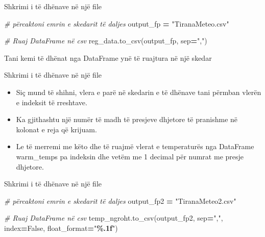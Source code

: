 \documentclass[
  ignorenonframetext,
]{beamer}
\newenvironment{Shaded}{\begin{snugshade}}{\end{snugshade}}
\newcommand{\CommentTok}[1]{\textcolor[rgb]{0.56,0.35,0.01}{\textit{#1}}}
\newcommand{\NormalTok}[1]{#1}
\newcommand{\OperatorTok}[1]{\textcolor[rgb]{0.81,0.36,0.00}{\textbf{#1}}}
\newcommand{\SpecialCharTok}[1]{\textcolor[rgb]{0.81,0.36,0.00}{\textbf{#1}}}
\newcommand{\StringTok}[1]{\textcolor[rgb]{0.31,0.60,0.02}{#1}}
\newcommand{\VariableTok}[1]{\textcolor[rgb]{0.00,0.00,0.00}{#1}}
\begin{document}
\begin{frame}[fragile]{Shkrimi i të dhënave në një file}
\protect\hypertarget{shkrimi-i-tuxeb-dhuxebnave-nuxeb-njuxeb-file-2}{}
\begin{Shaded}
\begin{Highlighting}[]
\CommentTok{\# përcaktoni emrin e skedarit të daljes}
\NormalTok{output\_fp }\OperatorTok{=} \StringTok{"TiranaMeteo.csv"}

\CommentTok{\# Ruaj DataFrame në csv}
\NormalTok{reg\_data.to\_csv(output\_fp, sep}\OperatorTok{=}\StringTok{","}\NormalTok{)}
\end{Highlighting}
\end{Shaded}

Tani kemi të dhënat nga DataFrame ynë të ruajtura në një skedar
\end{frame}

\begin{frame}{Shkrimi i të dhënave në një file}
\protect\hypertarget{shkrimi-i-tuxeb-dhuxebnave-nuxeb-njuxeb-file-3}{}
\begin{itemize}
\item
  Siç mund të shihni, vlera e parë në skedarin e të dhënave tani përmban
  vlerën e indeksit të rreshtave.
\item
  Ka gjithashtu një numër të madh të presjeve dhjetore të pranishme në
  kolonat e reja që krijuam.
\item
  Le të merremi me këto dhe të ruajmë vlerat e temperaturës nga
  DataFrame warm\_temps pa indeksin dhe vetëm me 1 decimal për numrat me
  presje dhjetore.
\end{itemize}
\end{frame}

\begin{frame}[fragile]{Shkrimi i të dhënave në një file}
\protect\hypertarget{shkrimi-i-tuxeb-dhuxebnave-nuxeb-njuxeb-file-4}{}
\begin{Shaded}
\begin{Highlighting}[]
\CommentTok{\# përcaktoni emrin e skedarit të daljes}
\NormalTok{output\_fp2 }\OperatorTok{=} \StringTok{"TiranaMeteo2.csv"}

\CommentTok{\# Ruaj DataFrame në csv}
\NormalTok{temp\_ngroht.to\_csv(output\_fp2, sep}\OperatorTok{=}\StringTok{","}\NormalTok{, index}\OperatorTok{=}\VariableTok{False}\NormalTok{, float\_format}\OperatorTok{=}\StringTok{"}\SpecialCharTok{\%.1f}\StringTok{"}\NormalTok{)}
\end{Highlighting}
\end{Shaded}
\end{frame}
\end{document}
